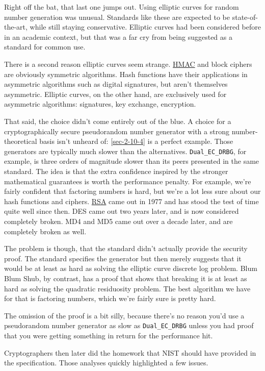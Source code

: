 \documentclass[11pt,ebook,table,dvipsnames]{memoir}
\begin{document}
Right off the bat, that last one jumps out. Using elliptic curves for
random number generation was unusual. Standards like these are
expected to be state-of-the-art, while still staying conservative.
Elliptic curves had been considered before in an academic context, but
that was a far cry from being suggested as a standard for common use.

There is a second reason elliptic curves seem strange. \hyperref[HMAC]{HMAC} and block
ciphers are obviously symmetric algorithms. Hash functions have their
applications in asymmetric algorithms such as digital signatures, but
aren't themselves asymmetric. Elliptic curves, on the other hand, are
exclusively used for asymmetric algorithms: signatures, key exchange,
encryption.

That said, the choice didn't come entirely out of the blue. A choice
for a cryptographically secure pseudorandom number generator with a
strong number-theoretical basis isn't unheard of: \ref{sec-2-10-4} is a
perfect example. Those generators are typically much slower than the
alternatives. \verb~Dual_EC_DRBG~, for example, is three orders of
magnitude slower than its peers presented in the same standard. The
idea is that the extra confidence inspired by the stronger
mathematical guarantees is worth the performance penalty. For example,
we're fairly confident that factoring numbers is hard, but we're a lot
less sure about our hash functions and ciphers. \hyperref[RSA]{RSA} came out in 1977
and has stood the test of time quite well since then. \gls{DES} came
out two years later, and is now considered completely broken. MD4 and
MD5 came out over a decade later, and are completely broken as well.

The problem is though, that the standard didn't actually provide the
security proof. The standard specifies the generator but then merely
suggests that it would be at least as hard as solving the elliptic
curve discrete log problem. Blum Blum Shub, by contrast, has a proof
that shows that breaking it is at least as hard as solving the
quadratic residuosity problem. The best algorithm we have for that is
factoring numbers, which we're fairly sure is pretty hard.

The omission of the proof is a bit silly, because there's no reason
you'd use a pseudorandom number generator as slow as \verb~Dual_EC_DRBG~
unless you had proof that you were getting something in return for the
performance hit.

Cryptographers then later did the homework that NIST should have
provided in the specification\cite{ecdrbg1}\cite{ecdrbg2}. Those
analyses quickly highlighted a few issues.
\end{document}
